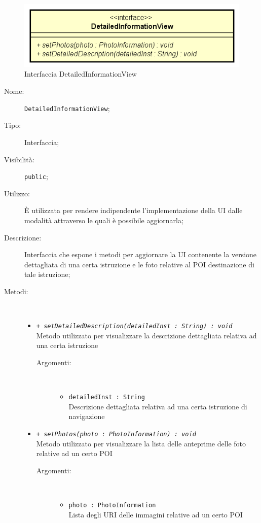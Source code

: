 \documentclass[../DefinizioneDiProdotto.tex]{subfiles}
\begin{document}
    \begin{figure}[H]
        \centering
        \includegraphics{img/DetailedInformationView.png}
        \caption{Interfaccia DetailedInformationView}\label{fig:view::DetailedInformationView} 
    \end{figure}
    \begin{description}
\item[Nome:] \texttt{DetailedInformationView};
\item[Tipo:] Interfaccia;
\item[Visibilità:] \texttt{public};
\item[Utilizzo:] È utilizzata per rendere indipendente l'implementazione della UI dalle modalità attraverso le quali è possibile aggiornarla;
\item[Descrizione:] Interfaccia che espone i metodi per aggiornare la UI contenente la versione dettagliata di una certa istruzione e le foto relative al POI destinazione di tale istruzione;
\item[Metodi:] \
\begin{itemize}
\item \texttt{+ \textit{setDetailedDescription(detailedInst : String) : void}}\\
Metodo utilizzato per visualizzare la descrizione dettagliata relativa ad una certa istruzione
 \begin{description}
\item[Argomenti:] \
\begin{itemize}
\item \texttt{detailedInst : String}\\
Descrizione dettagliata relativa ad una certa istruzione di navigazione\end{itemize}
\end{description}
\item \texttt{+ \textit{setPhotos(photo : PhotoInformation) : void}}\\
Metodo utilizzato per visualizzare la lista delle anteprime delle foto relative ad un certo POI
 \begin{description}
\item[Argomenti:] \
\begin{itemize}
\item \texttt{photo : PhotoInformation}\\
Lista degli URI delle immagini relative ad un certo POI\end{itemize}
\end{description}
\end{itemize}
\end{description}
\end{document}
